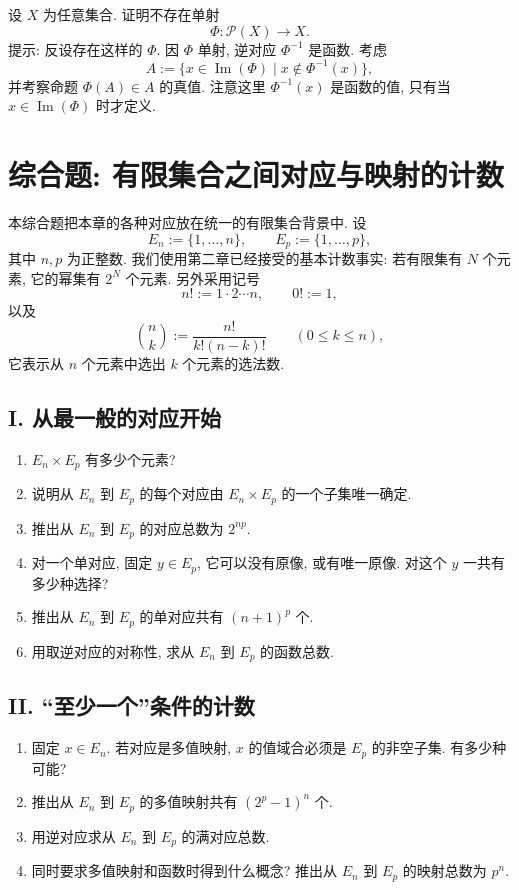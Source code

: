 \documentclass[usesamecnt, thmcnt=section, lang=cn, newtx, 10pt, scheme=chinese]{elegantbook}
\begin{document}
\begin{challenge}\label{ch:corr-02}
设 $X$ 为任意集合. 证明不存在单射
\[
 \Phi:\mathscr P(X)\longrightarrow X.
\]
提示: 反设存在这样的 $\Phi$. 因 $\Phi$ 单射, 逆对应 $\Phi^{-1}$ 是函数. 考虑
\[
 A:=\{x\in\operatorname{Im}(\Phi)\mid x\notin\Phi^{-1}(x)\},
\]
并考察命题 $\Phi(A)\in A$ 的真值. 注意这里 $\Phi^{-1}(x)$ 是函数的值, 只有当 $x\in\operatorname{Im}(\Phi)$ 时才定义.
\end{challenge}

\section{综合题: 有限集合之间对应与映射的计数}

本综合题把本章的各种对应放在统一的有限集合背景中. 设
\[
 E_n:=\{1,\ldots,n\},
 \qquad
 E_p:=\{1,\ldots,p\},
\]
其中 $n,p$ 为正整数. 我们使用第二章已经接受的基本计数事实: 若有限集有 $N$ 个元素, 它的幂集有 $2^N$ 个元素. 另外采用记号
\[
 n!:=1\cdot2\cdots n,
 \qquad 0!:=1,
\]
以及
\[
 \binom{n}{k}:=\frac{n!}{k!(n-k)!}
 \qquad(0\leq k\leq n),
\]
它表示从 $n$ 个元素中选出 $k$ 个元素的选法数.

\subsection*{I. 从最一般的对应开始}
\begin{enumerate}[label=\textbf{\arabic*.}, series=corr-count]
  \item $E_n\times E_p$ 有多少个元素?
  \item 说明从 $E_n$ 到 $E_p$ 的每个对应由 $E_n\times E_p$ 的一个子集唯一确定.
  \item 推出从 $E_n$ 到 $E_p$ 的对应总数为 $2^{np}$.
  \item 对一个单对应, 固定 $y\in E_p$, 它可以没有原像, 或有唯一原像. 对这个 $y$ 一共有多少种选择?
  \item 推出从 $E_n$ 到 $E_p$ 的单对应共有 $(n+1)^p$ 个.
  \item 用取逆对应的对称性, 求从 $E_n$ 到 $E_p$ 的函数总数.
\end{enumerate}

\subsection*{II. ``至少一个''条件的计数}
\begin{enumerate}[label=\textbf{\arabic*.}, resume=corr-count]
  \item 固定 $x\in E_n$. 若对应是多值映射, $x$ 的值域合必须是 $E_p$ 的非空子集. 有多少种可能?
  \item 推出从 $E_n$ 到 $E_p$ 的多值映射共有 $(2^p-1)^n$ 个.
  \item 用逆对应求从 $E_n$ 到 $E_p$ 的满对应总数.
  \item 同时要求多值映射和函数时得到什么概念? 推出从 $E_n$ 到 $E_p$ 的映射总数为 $p^n$.
\end{enumerate}
\end{document}
